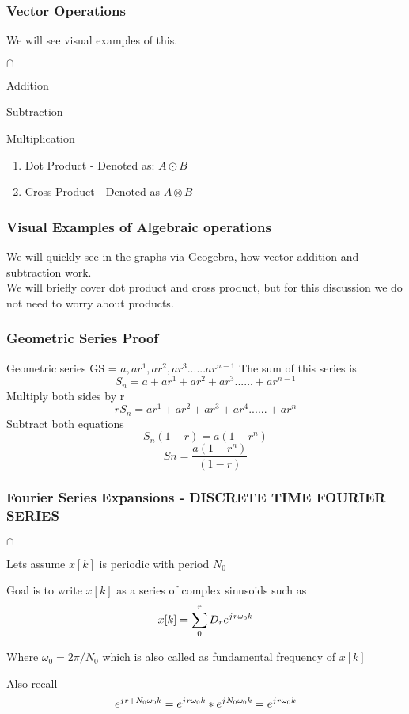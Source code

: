 \documentclass[10pt]{beamer}
\newcommand{\ju}{{j\mkern1mu}}
\begin{document}
\begin{frame}
	\frametitle{ Vector Operations}
	
	We will see visual examples of this.
	
	\begin{list}{$\cap$}{}
		\item Addition 
		\item Subtraction
		\item Multiplication
		
		\begin{enumerate}
			\item Dot Product - Denoted as: $A \odot B$
			\item Cross Product - Denoted as $A \otimes B$
		\end{enumerate}
	
	\end{list}

\end{frame}

\begin{frame}
	\frametitle{Visual Examples of Algebraic operations}

	We will quickly see in the graphs via Geogebra, how vector addition and subtraction work. \\
	
	We will briefly cover dot product and cross product, but for this discussion we do not need to worry about products.\\
	
	
\end{frame}

\begin{frame}
	\frametitle{Geometric Series Proof}
	Geometric series GS = $a,ar^1 ,ar^2, ar^3 ...... ar^{n-1}$
	The sum of this series is 
	$$S_n = a+ar^1 +ar^2+ar^3 ...... + ar^{n-1} $$
	Multiply both sides by r
	$$rS_n = ar^1+ar^2 +ar^3+ar^4 ...... + ar^{n} $$
	Subtract both equations
	$$S_n(1-r) = a(1-r^n)$$
	$$Sn = \frac{a(1-r^n)}{(1-r)}$$
	
	
\end{frame}



\begin{frame}
	\frametitle{Fourier Series Expansions - DISCRETE TIME FOURIER SERIES}
	
		\begin{list}{$\cap$}{}
			
			\item Lets assume $x[k]$ is periodic with period $N_0$
			\item Goal is to write $x[k]$ as a series of complex sinusoids such as $$x[k] = \sum_{0}^{r}{D_r e^ {\ju r\omega_0 k}}$$
			\item Where $\omega_0 = 2\pi/N_0$ which is also called as fundamental frequency of $x[k]$
			
			\item Also recall $$ e^ {\ju {r +N_0}\omega_0 k} =  e^ {\ju {r }\omega_0 k} * e^ {\ju {N_0}\omega_0 k} = e^ {\ju {r }\omega_0 k} $$

		\end{list}
		
\end{frame}
\end{document}
